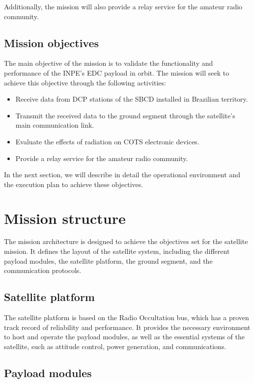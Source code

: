 Additionally, the mission will also provide a relay service for the amateur radio community.

\subsection{Mission objectives}

The main objective of the mission is to validate the functionality and performance of the INPE's EDC payload in orbit. The mission will seek to achieve this objective through the following activities:

\begin{itemize}
    \item Receive data from DCP stations of the SBCD installed in Brazilian territory.
    \item Transmit the received data to the ground segment through the satellite's main communication link.
    \item Evaluate the effects of radiation on COTS electronic devices.
    \item Provide a relay service for the amateur radio community.
\end{itemize}

In the next section, we will describe in detail the operational environment and the execution plan to achieve these objectives.

\section{Mission structure}


The mission architecture is designed to achieve the objectives set for the satellite mission. It defines the layout of the satellite system, including the different payload modules, the satellite platform, the ground segment, and the communication protocols.

\subsection{Satellite platform}

The satellite platform is based on the Radio Occultation bus, which has a proven track record of reliability and performance. It provides the necessary environment to host and operate the payload modules, as well as the essential systems of the satellite, such as attitude control, power generation, and communications.

\subsection{Payload modules}

